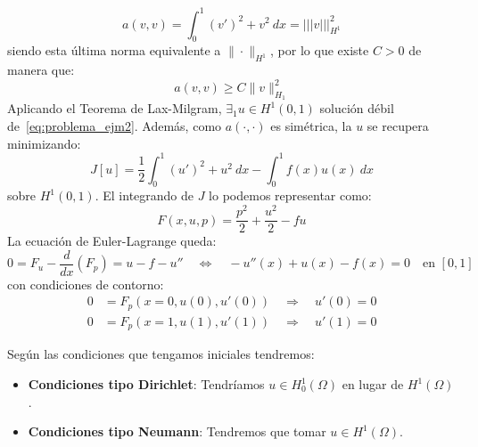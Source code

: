 \documentclass[12pt]{book}
\begin{document}
\begin{ejemplo}
        \begin{equation*}
            a(v,v) = \int_{0}^{1} {(v')}^{2}+v^2~dx = \lvert\!\lvert\!\lvert v\rvert\!\rvert\!\rvert_{H^1}^2
        \end{equation*}
        siendo esta última norma equivalente a $\|\cdot \|_{H^1}$, por lo que existe $C>0$ de manera que:
        \begin{equation*}
            a(v,v) \geq C\|v\|^2_{H_1}
        \end{equation*}
        Aplicando el Teorema de Lax-Milgram, $\exists_1 u\in H^1(0,1)$ solución débil de~\eqref{eq:problema_ejm2}. Además, como $a(\cdot ,\cdot )$ es simétrica, la $u$ se recupera minimizando:
        \begin{equation*}
            J[u] = \frac{1}{2}\int_{0}^{1} {(u')}^{2}+u^2~dx  - \int_{0}^{1} f(x)u(x)~dx 
        \end{equation*}
        sobre $H^1(0,1)$. El integrando de $J$ lo podemos representar como:
        \begin{equation*}
            F(x,u,p) = \frac{p^2}{2} + \frac{u^2}{2} - fu
        \end{equation*}
        La ecuación de Euler-Lagrange queda:
        \begin{equation*}
            0 = F_u - \frac{d}{dx}(F_p) = u - f - u'' \quad\Longleftrightarrow\quad -u''(x) +u(x)-f(x) = 0 \quad \text{en\ }[0,1]
        \end{equation*}
        con condiciones de contorno:
        \begin{align*}
            0 &= F_p(x=0,u(0),u'(0)) \quad\Longrightarrow\quad u'(0) = 0 \\
            0 &= F_p(x=1,u(1),u'(1)) \quad\Longrightarrow\quad u'(1) = 0
        \end{align*}
    \end{ejemplo}

    \begin{observacion}
        Según las condiciones que tengamos iniciales tendremos:
        \begin{itemize}
            \item \textbf{Condiciones tipo Dirichlet}: Tendríamos $u\in H_0^1(\Omega)$ en lugar de $H^1(\Omega)$.
            \item \textbf{Condiciones tipo Neumann}: Tendremos que tomar $u\in H^1(\Omega)$.
        \end{itemize}
    \end{observacion}
\end{document}
